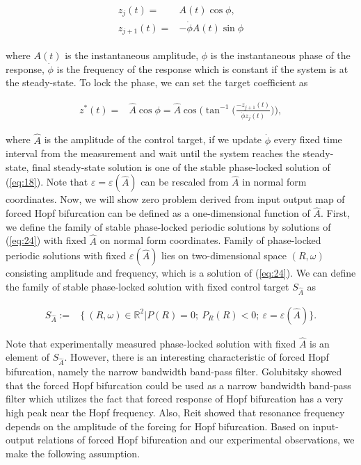 \documentclass[openacc]{rsproca_new}%
\def\real{\mathbb{R}}
\def\epsilon{\varepsilon}
\newcommand{\Eref}[1]{(\ref{#1})}
\begin{document}
\begin{align}\label{eq:25}
\begin{split}
z_{j}(t)=&A(t)\cos{\phi},\\
z_{j+1}(t)=&-\dot\phi A(t)\sin{\phi}
\end{split}
\end{align}

\noindent where $A(t)$ is the instantaneous amplitude, $\phi$ is the instantaneous phase of the response, $\dot\phi$ is the frequency of the response which is constant if the system is at the steady-state. To lock the phase, we can set the target coefficient as

\begin{align}\label{eq:26}
z^*(t)=&\hat A\cos{\phi}=\hat A\cos\Big(\tan^{-1}\Big({\frac{-z_{j+1}(t)}{ \dot \phi z_{j}(t)}}\Big) \Big),
\end{align}

\noindent where $\hat A$ is the amplitude of the control target, if we update $\dot\phi$ every fixed time interval from the measurement and wait until the system reaches the steady-state, final steady-state solution is one of the stable phase-locked solution of \Eref{eq:18}. Note that $\epsilon=\epsilon(\hat A)$ can be rescaled from $\hat A$ in normal form coordinates. Now, we will show zero problem derived from input output map of forced Hopf bifurcation can be defined as a one-dimensional function of $\hat A$. First, we define the family of stable phase-locked periodic solutions by solutions of \Eref{eq:24} with fixed $\hat A$ on normal form coordinates. Family of phase-locked periodic solutions with fixed $\epsilon(\hat A)$ lies on two-dimensional space $(R,\omega)$ consisting amplitude and frequency, which is a solution of \Eref{eq:24}. We can define the family of stable phase-locked solution with fixed control target $S_{\hat A}$ as

\begin{align}\label{eq:27-1}
S_{\hat A}:=&\{\:(R,\omega)\in \real^2| P(R)=0;\:P_R(R)<0;\:\epsilon=\epsilon(\hat A)\}.
\end{align}

\noindent Note that experimentally measured phase-locked solution with fixed $\hat A$ is an element of $S_{\hat A}$. However, there is an interesting characteristic of forced Hopf bifurcation, namely the narrow bandwidth band-pass filter. Golubitsky \cite{golubitsky2009feed} showed that the forced Hopf bifurcation could be used as a narrow bandwidth band-pass filter which utilizes the fact that forced response of Hopf bifurcation has a very high peak near the Hopf frequency. Also, Reit \cite{reit2014class} showed that resonance frequency depends on the amplitude of the forcing for Hopf bifurcation. Based on input-output relations of forced Hopf bifurcation and our experimental observations, we make the following assumption.
\end{document}
